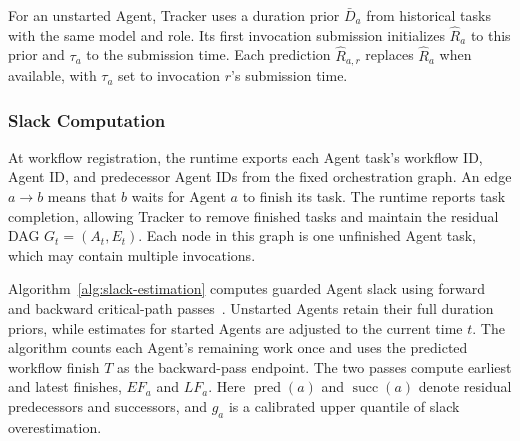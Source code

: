 For an unstarted Agent, Tracker uses a duration prior $\bar D_a$ from
historical tasks with the same model and role. Its first invocation
submission initializes $\widehat R_a$ to this prior and $\tau_a$ to the
submission time. Each prediction $\widehat R_{a,r}$ replaces
$\widehat R_a$ when available, with $\tau_a$ set to invocation $r$'s
submission time.

\subsubsection{Slack Computation}
\label{sec:tracker-slack}

At workflow registration, the runtime exports each Agent task's workflow
ID, Agent ID, and predecessor Agent IDs from the fixed orchestration graph.
An edge $a\to b$ means that $b$ waits for Agent $a$ to finish its task.
The runtime reports task completion, allowing Tracker to remove finished
tasks and maintain the residual DAG $G_t=(A_t,E_t)$. Each node in this
graph is one unfinished Agent task, which may contain multiple invocations.

Algorithm~\ref{alg:slack-estimation} computes guarded Agent slack using
forward and backward critical-path passes~\cite{kelley1959cpm}.
Unstarted Agents retain their full duration priors, while estimates for
started Agents are adjusted to the current time $t$. The algorithm counts
each Agent's remaining work once and uses the predicted workflow finish
$T$ as the backward-pass endpoint. The two passes compute earliest and
latest finishes, $EF_a$ and $LF_a$. Here $\operatorname{pred}(a)$ and
$\operatorname{succ}(a)$ denote residual predecessors and successors,
and $g_a$ is a calibrated upper quantile of slack overestimation.

